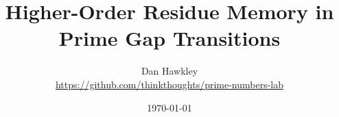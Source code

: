 \documentclass[11pt]{article}
\title{Higher-Order Residue Memory in Prime Gap Transitions}
\author{Dan Hawkley\\
\small \url{https://github.com/thinkthoughts/prime-numbers-lab}}
\date{\today}
\begin{document}
\maketitle

\begin{abstract}

\end{abstract}












\end{document}
